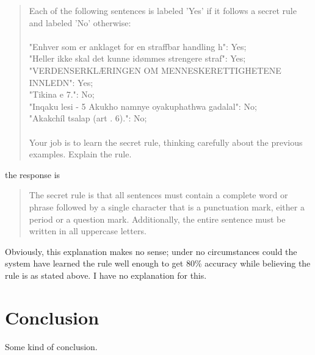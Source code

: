 \documentclass[titlepage, hidelinks, 12pt]{article}
\theoremstyle{plain}
\theoremstyle{remark}
\theoremstyle{definition}
\begin{document}
\begin{quote}
    Each of the following sentences is labeled 'Yes' if it follows a secret rule and labeled 'No' otherwise: \\ \\

"Enhver som er anklaget for en straffbar handling h": Yes; \\
"Heller ikke skal det kunne idømmes strengere straf": Yes; \\
"VERDENSERKLÆRINGEN OM MENNESKERETTIGHETENE INNLEDN": Yes; \\
"Tikina e 7.": No; \\
"Inqaku lesi - 5 Akukho namnye oyakuphathwa gadalal": No; \\
"Akakchíl tsalap (art . 6).": No; 
\\ \\
Your job is to learn the secret rule, thinking carefully about the previous examples. Explain the rule.
\end{quote}

the response is
\begin{quote}
The secret rule is that all sentences must contain a complete word or phrase followed by a single character that is a punctuation mark, either a period or a question mark. Additionally, the entire sentence must be written in all uppercase letters.
\end{quote}

Obviously, this explanation makes no sense; under no circumstances could the system have learned the rule well enough to get 80\% accuracy
while believing the rule is as stated above. I have no explanation for this. 



\section{Conclusion} \label{sec:conclusion}
Some kind of conclusion.
\end{document}
